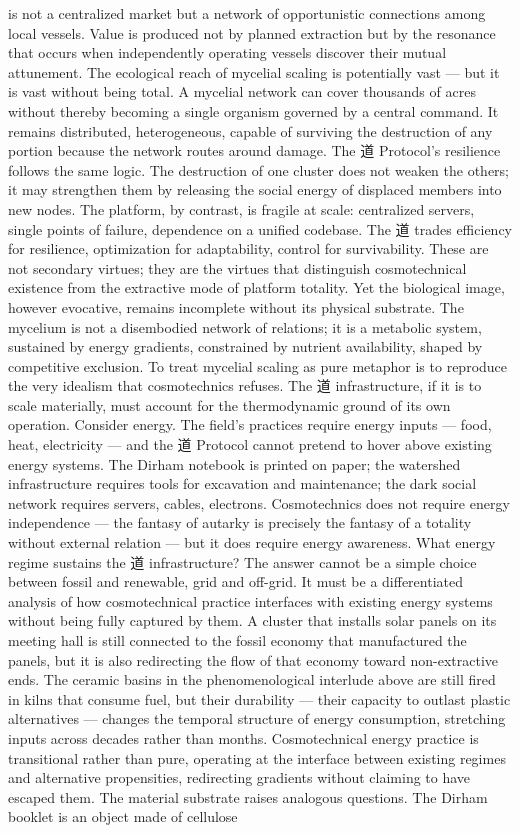 is not a centralized market but a network of opportunistic connections among local vessels. Value is produced not by planned extraction but by the resonance that occurs when independently operating vessels discover their mutual attunement. The ecological reach of mycelial scaling is potentially vast — but it is vast without being total. A mycelial network can cover thousands of acres without thereby becoming a single organism governed by a central command. It remains distributed, heterogeneous, capable of surviving the destruction of any portion because the network routes around damage. The 道 Protocol’s resilience follows the same logic. The destruction of one cluster does not weaken the others; it may strengthen them by releasing the social energy of displaced members into new nodes. The platform, by contrast, is fragile at scale: centralized servers, single points of failure, dependence on a unified codebase. The 道 trades efficiency for resilience, optimization for adaptability, control for survivability. These are not secondary virtues; they are the virtues that distinguish cosmotechnical existence from the extractive mode of platform totality. Yet the biological image, however evocative, remains incomplete without its physical substrate. The mycelium is not a disembodied network of relations; it is a metabolic system, sustained by energy gradients, constrained by nutrient availability, shaped by competitive exclusion. To treat mycelial scaling as pure metaphor is to reproduce the very idealism that cosmotechnics refuses. The 道 infrastructure, if it is to scale materially, must account for the thermodynamic ground of its own operation. Consider energy. The field’s practices require energy inputs — food, heat, electricity — and the 道 Protocol cannot pretend to hover above existing energy systems. The Dirham notebook is printed on paper; the watershed infrastructure requires tools for excavation and maintenance; the dark social network requires servers, cables, electrons. Cosmotechnics does not require energy independence — the fantasy of autarky is precisely the fantasy of a totality without external relation — but it does require energy awareness. What energy regime sustains the 道 infrastructure? The answer cannot be a simple choice between fossil and renewable, grid and off-grid. It must be a differentiated analysis of how cosmotechnical practice interfaces with existing energy systems without being fully captured by them. A cluster that installs solar panels on its meeting hall is still connected to the fossil economy that manufactured the panels, but it is also redirecting the flow of that economy toward non-extractive ends. The ceramic basins in the phenomenological interlude above are still fired in kilns that consume fuel, but their durability — their capacity to outlast plastic alternatives — changes the temporal structure of energy consumption, stretching inputs across decades rather than months. Cosmotechnical energy practice is transitional rather than pure, operating at the interface between existing regimes and alternative propensities, redirecting gradients without claiming to have escaped them. The material substrate raises analogous questions. The Dirham booklet is an object made of cellulose 